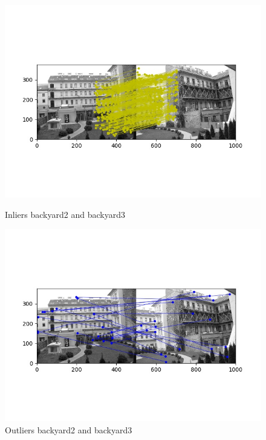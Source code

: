 \documentclass[12pt,a4paper]{report}
\begin{document}
\begin{figure}[!htb]
  \includegraphics[width=\linewidth]{outMatches_inlier_backyard2}
        \caption{Inliers backyard2 and backyard3}
\endminipage\hfill
{}
  \includegraphics[width=\linewidth]{outMatches_outlier_backyard2}
        \caption{Outliers backyard2 and backyard3}
\endminipage\hfill
\end{figure}
\newpage
\end{document}
